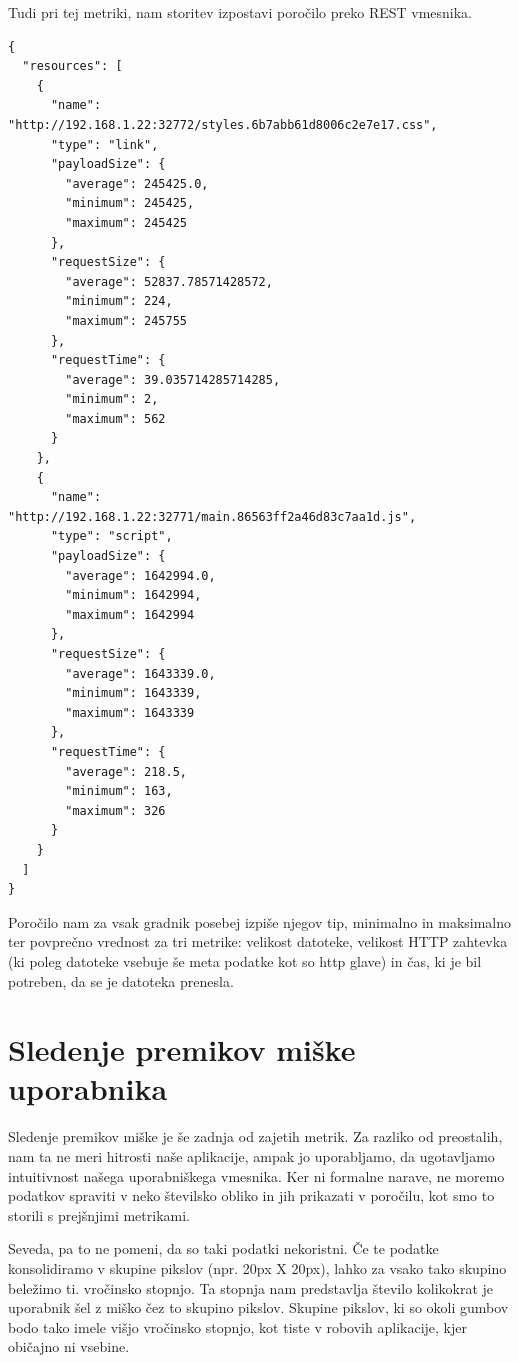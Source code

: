 \documentclass[a4paper, 12pt]{book}
\begin{document}
Tudi pri tej metriki, nam storitev izpostavi poročilo preko REST vmesnika.

\begin{lstlisting}[label=resource_load_report, caption=Poročilo časa nalaganja gradnikov strani]
{
  "resources": [
    {
      "name": "http://192.168.1.22:32772/styles.6b7abb61d8006c2e7e17.css",
      "type": "link",
      "payloadSize": {
        "average": 245425.0,
        "minimum": 245425,
        "maximum": 245425
      },
      "requestSize": {
        "average": 52837.78571428572,
        "minimum": 224,
        "maximum": 245755
      },
      "requestTime": {
        "average": 39.035714285714285,
        "minimum": 2,
        "maximum": 562
      }
    },
    {
      "name": "http://192.168.1.22:32771/main.86563ff2a46d83c7aa1d.js",
      "type": "script",
      "payloadSize": {
        "average": 1642994.0,
        "minimum": 1642994,
        "maximum": 1642994
      },
      "requestSize": {
        "average": 1643339.0,
        "minimum": 1643339,
        "maximum": 1643339
      },
      "requestTime": {
        "average": 218.5,
        "minimum": 163,
        "maximum": 326
      }
    }
  ]
}
\end{lstlisting}

Poročilo nam za vsak gradnik posebej izpiše njegov tip, minimalno in maksimalno ter povprečno vrednost za tri metrike: velikost datoteke, velikost HTTP zahtevka (ki poleg datoteke vsebuje še meta podatke kot so http glave) in čas, ki je bil potreben, da se je datoteka prenesla.

\section{Sledenje premikov miške uporabnika}
\label{ch2:sec4}

Sledenje premikov miške je še zadnja od zajetih metrik. Za razliko od preostalih, nam ta ne meri hitrosti naše aplikacije, ampak jo uporabljamo, da ugotavljamo intuitivnost našega uporabniškega vmesnika. Ker ni formalne narave, ne moremo podatkov spraviti v neko številsko obliko in jih prikazati v poročilu, kot smo to storili s prejšnjimi metrikami.

Seveda, pa to ne pomeni, da so taki podatki nekoristni. Če te podatke konsolidiramo v skupine pikslov (npr. 20px X 20px), lahko za vsako tako skupino beležimo ti. vročinsko stopnjo. Ta stopnja nam predstavlja število kolikokrat je uporabnik šel z miško čez to skupino pikslov. Skupine pikslov, ki so okoli gumbov bodo tako imele višjo vročinsko stopnjo, kot tiste v robovih aplikacije, kjer običajno ni vsebine.
\end{document}
